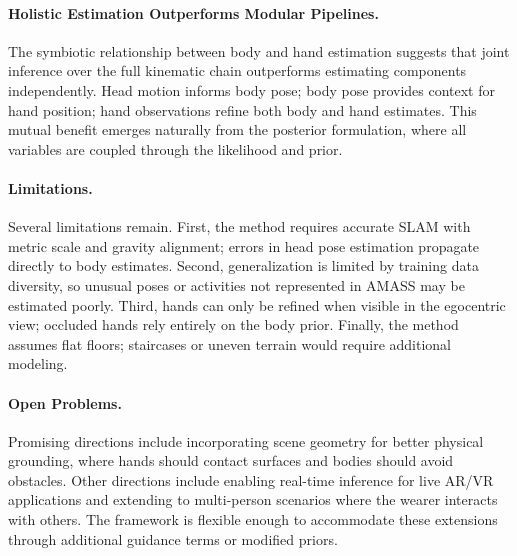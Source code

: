 \paragraph{Holistic Estimation Outperforms Modular Pipelines.}
The symbiotic relationship between body and hand estimation suggests
that joint inference over the full kinematic chain outperforms
estimating components independently. Head motion informs body pose;
body pose provides context for hand position; hand observations
refine both body and hand estimates. This mutual benefit emerges
naturally from the posterior formulation, where all variables are
coupled through the likelihood and prior.

\paragraph{Limitations.}
Several limitations remain. First, the method requires accurate SLAM
with metric scale and gravity alignment; errors in head pose
estimation propagate directly to body estimates. Second,
generalization is limited by training data diversity, so unusual
poses or activities not represented in AMASS may be estimated poorly.
Third, hands can only be refined when visible in the egocentric view;
occluded hands rely entirely on the body prior. Finally, the method
assumes flat floors; staircases or uneven terrain would require
additional modeling.

\paragraph{Open Problems.}
Promising directions include incorporating scene geometry for better
physical grounding, where hands should contact surfaces and bodies
should avoid obstacles. Other directions include enabling real-time
inference for live AR/VR applications and extending to multi-person
scenarios where the wearer interacts with others. The framework is
flexible enough to accommodate these extensions through additional
guidance terms or modified priors.